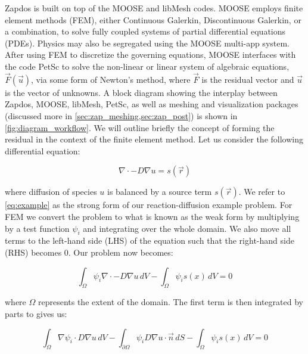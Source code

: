 Zapdos is built on top of the MOOSE \cite{mooseSite} and libMesh \cite{libmeshSite} codes. MOOSE employs finite element methods (FEM), either Continuous Galerkin, Discontinuous Galerkin, or a combination, to solve fully coupled systems of partial differential equations (PDEs). Physics may also be segregated using the MOOSE multi-app system. After using FEM to discretize the governing equations, MOOSE interfaces with the code PetSc \cite{petscSite} to solve the non-linear or linear system of algebraic equations, $\vec{F}(\vec{u})$, via some form of Newton's method, where $\vec{F}$ is the residual vector and $\vec{u}$ is the vector of unknowns. A block diagram showing the interplay between Zapdos, MOOSE, libMesh, PetSc, as well as meshing and visualization packages (discussed more in \cref{sec:zap_meshing,sec:zap_post}) is shown in \cref{fig:diagram_workflow}. We will outline briefly the concept of forming the residual in the context of the finite element method. Let us consider the following differential equation:

\begin{equation}
  \nabla\cdot-D\nabla u = s(\vec{r})
  \label{eq:example}
\end{equation}

where diffusion of species $u$ is balanced by a source term $s(\vec{r})$. We refer to \cref{eq:example} as the strong form of our reaction-diffusion example problem. For FEM we convert the problem to what is known as the weak form by multiplying by a test function $\psi_i$ and integrating over the whole domain. We also move all terms to the left-hand side (LHS) of the equation such that the right-hand side (RHS) becomes 0. Our problem now becomes:

\begin{equation}
  \int_{\Omega}\psi_i\nabla\cdot-D\nabla u\,dV - \int_{\Omega}\psi_is(x)\,dV = 0
  \label{eq:example_weak}
\end{equation}

where $\Omega$ represents the extent of the domain. The first term is then integrated by parts to gives us:

\begin{equation}
  \int_{\Omega}\nabla\psi_i\cdot D\nabla u\,dV - \int_{\partial\Omega}\psi_iD\nabla u \cdot \vec{n}\,dS -\int_{\Omega}\psi_is(x)\,dV = 0
  \label{eq:example_weak_parts}
\end{equation}

